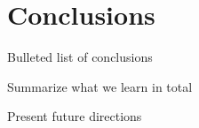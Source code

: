 \chapter{Conclusions} \label{chap:conc}

Bulleted list of conclusions

Summarize what we learn in total

Present future directions